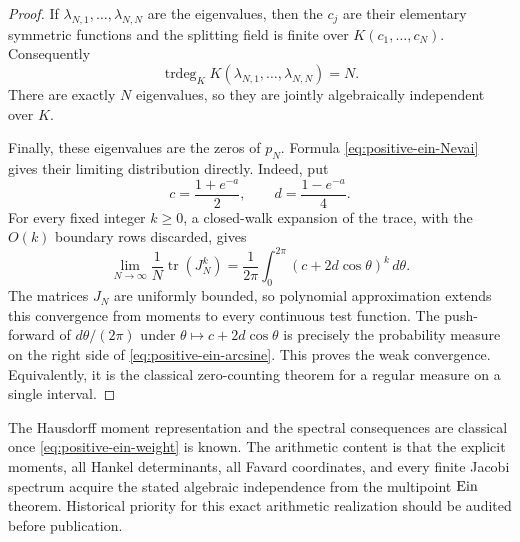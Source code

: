 \begin{proof}
If $\lambda_{N,1},\ldots,\lambda_{N,N}$ are the eigenvalues, then the
$c_j$ are their elementary symmetric functions and the splitting field
is finite over $K(c_1,\ldots,c_N)$.  Consequently
\[
 \operatorname{trdeg}_K
 K(\lambda_{N,1},\ldots,\lambda_{N,N})=N.
\]
There are exactly $N$ eigenvalues, so they are jointly algebraically
independent over $K$.

Finally, these eigenvalues are the zeros of $p_N$.  Formula
\eqref{eq:positive-ein-Nevai} gives their limiting distribution directly.
Indeed, put
\[
 c=\frac{1+e^{-a}}2,
 \qquad d=\frac{1-e^{-a}}4.
\]
For every fixed integer $k\geq0$, a closed-walk expansion of the trace,
with the $O(k)$ boundary rows discarded, gives
\[
 \lim_{N\to\infty}\frac1N\operatorname{tr}(J_N^k)
 =\frac1{2\pi}\int_0^{2\pi}(c+2d\cos\theta)^k\,d\theta.
\]
The matrices $J_N$ are uniformly bounded, so polynomial approximation
extends this convergence from moments to every continuous test function.
The push-forward of $d\theta/(2\pi)$ under
$\theta\mapsto c+2d\cos\theta$ is precisely the probability measure on
the right side of \eqref{eq:positive-ein-arcsine}.  This proves the weak
convergence.  Equivalently, it is the classical zero-counting theorem for
a regular measure on a single interval.
\end{proof}

\begin{remark}
The Hausdorff moment representation and the spectral consequences are
classical once \eqref{eq:positive-ein-weight} is known.  The arithmetic
content is that the explicit moments, all Hankel determinants, all
Favard coordinates, and every finite Jacobi spectrum acquire the stated
algebraic independence from the multipoint $\operatorname{Ein}$ theorem.  Historical
priority for this exact arithmetic realization should be audited before
publication.
\end{remark}
